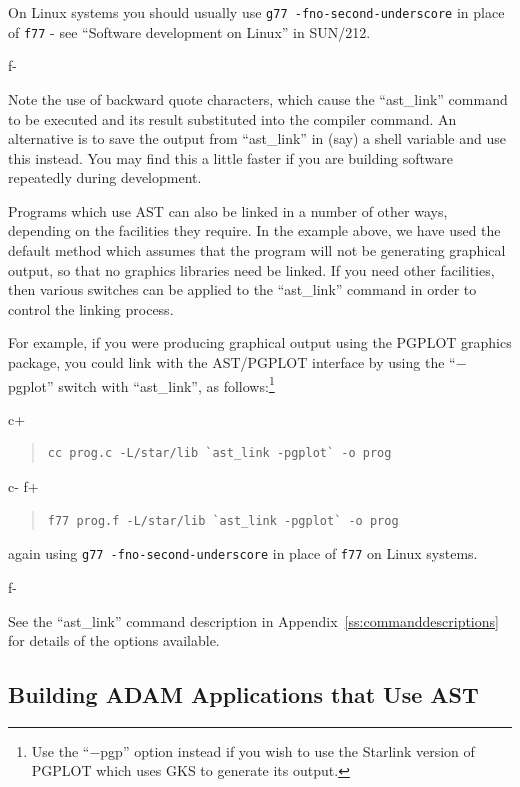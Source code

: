 \documentclass[twoside,11pt]{article}
\newcommand{\xref}[3]{#1}
\newcommand{\appref}[1]{Appendix~\ref{#1}}
\newcommand{\appref}[1]{\ref{#1}}
\begin{document}
On Linux systems you should usually use \verb+g77 -fno-second-underscore+ in
place of \verb+f77+ - see \xref{``Software development on Linux''}{sun212}
{software_development_on_linux} in \xref{SUN/212}{sun212}{}.

f-

Note the use of backward quote characters, which cause the
``ast\_link'' command to be executed and its result substituted into
the compiler command. An alternative is to save the output from
``ast\_link'' in (say) a shell variable and use this instead. You may
find this a little faster if you are building software repeatedly
during development.

Programs which use AST can also be linked in a number of other ways,
depending on the facilities they require. In the example above, we
have used the default method which assumes that the program will not
be generating graphical output, so that no graphics libraries need be
linked. If you need other facilities, then various switches can be
applied to the ``ast\_link'' command in order to control the linking
process.

For example, if you were producing graphical output using the PGPLOT
graphics package, you could link with the AST/PGPLOT interface by
using the ``$-$pgplot'' switch with ``ast\_link'', as
follows:\footnote{Use the ``$-$pgp'' option instead if you wish to use
the Starlink version of PGPLOT which uses GKS to generate its output.}

c+
\begin{quote}
\small
\begin{verbatim}
cc prog.c -L/star/lib `ast_link -pgplot` -o prog
\end{verbatim}
\normalsize
\end{quote}
c-
f+
\begin{quote}
\small
\begin{verbatim}
f77 prog.f -L/star/lib `ast_link -pgplot` -o prog
\end{verbatim}
\normalsize
\end{quote}

again using \verb+g77 -fno-second-underscore+ in place of \verb+f77+
on Linux systems.

f-

See the ``ast\_link'' command description in
\appref{ss:commanddescriptions} for details of the options available.

\subsection{Building ADAM Applications that Use AST}
\end{document}
